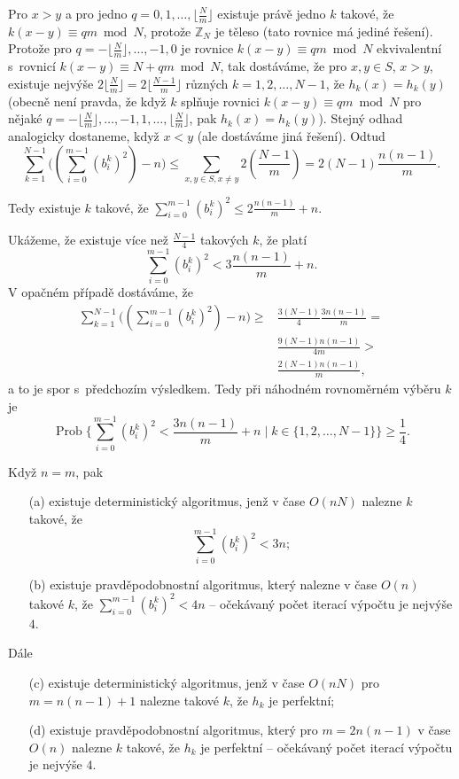 \documentclass[a4paper,12pt]{article}
\DeclareMathOperator*{\Prob}{Prob}
\begin{document}
Pro $x>y$ a pro jedno $q=0,1,\dots,\lfloor\frac Nm\rfloor$ e\-xis\-tuje 
právě jedno $k$ takové, že $k(x-y)\equiv qm\bmod N$, protože 
$\mathbb Z_N$ je těleso (tato rovnice má jediné řešení). 
Protože pro $q=-\lfloor\frac Nm\rfloor ,\dots,-1,0$ je rovnice $
k(x-y)\equiv qm\bmod N$ 
ekvivalentní s~rovnicí $k(x-y)\equiv N+qm\bmod N$, tak 
dostáváme, že pro $x,y\in S$, $x>y$, existuje nejvýše 
$2\lfloor\frac Nm\rfloor =2\lfloor\frac {N-1}m\rfloor$ různých $
k=1,2,\dots,N-1$, že $h_k(x)=h_k(y)$ (obecně není pravda, že když 
$k$ splňuje rovnici $k(x-y)\equiv qm\bmod N$ pro nějaké 
$q=-\lfloor\frac Nm\rfloor ,\dots,-1,1,\dots,\lfloor\frac Nm\rfloor$, 
pak $h_k(x)=h_k(y)$). Stejný odhad analogicky dostaneme, když $
x<y$ 
(ale dostáváme jiná řešení). Odtud 
$$\sum_{k=1}^{N-1}\big((\sum_{i=0}^{m-1}(b_i^k)^2)-n\big)\le\sum_{
x,y\in S,x\ne y}2(\frac {N-1}m)=2(N-1)\frac {n(n-1)}m.$$

Tedy existuje $k$ takové, že $\sum_{i=0}^{m-1}(b_i^
k)^2\le 2\frac {n(n-1)}m+n$. 

Ukážeme, že existuje více než $\frac {N-
1}4$ takových 
$k$, že platí
$$\sum_{i=0}^{m-1}(b_i^k)^2<3\frac {n(n-1)}m+n.$$
V opačném případě dostáváme, že 
\begin{align*}\sum_{k=1}^{N-1}\big((\sum_{i=0}^{m-1}(b_i^k)^2)-n\big)\ge&\frac {
3(N-1)}4\frac {3n(n-1)}m=\\
&\frac {9(N-1)n(n-1)}{4m}>\\
&\frac {2(N-1)n(n-1)}m,\end{align*}
a to je spor s~předchozím výsledkem. Tedy při náhodném rovnoměrném 
výběru $k$ je 
$$\Prob\{\sum_{i=0}^{m-1}(b_i^k)^2<\frac {3n(n-1)}m+n\mid k\in \{
1,2,\dots,N-1\}\}\ge\frac 14.$$

\begin{tvrzeni}Když $n=m$, pak 
\begin{enumerate}
\item[(a)]
existuje deterministický algoritmus, jenž v čase $O(nN)$ 
nalezne $k$ takové, že 
$$\sum_{i=0}^{m-1}(b_i^k)^2<3n;$$
\item[(b)]
existuje pravděpodobnostní algoritmus, který 
nalezne v čase $O(n)$ takové $k$, že $\sum_{i=0}^{m-1}(b_
i^k)^2<4n$ -- očekávaný počet iterací výpočtu je nejvýše $
4$.
\end{enumerate}
Dále 
\begin{enumerate}
\item[(c)]
existuje deterministický algoritmus, jenž v čase $O(nN)$ pro 
$m=n(n-1)+1$ nalezne takové $k$, že $h_k$ je 
perfektní;
\item[(d)]
existuje pravděpodobnostní algoritmus, který pro 
$m=2n(n-1)$ v čase $O(n)$ nalezne $k$ takové, že $h_k$ je 
perfektní -- očekávaný počet iterací výpočtu 
je nejvýše $4$.
\end{enumerate}
\end{tvrzeni}
\end{document}
